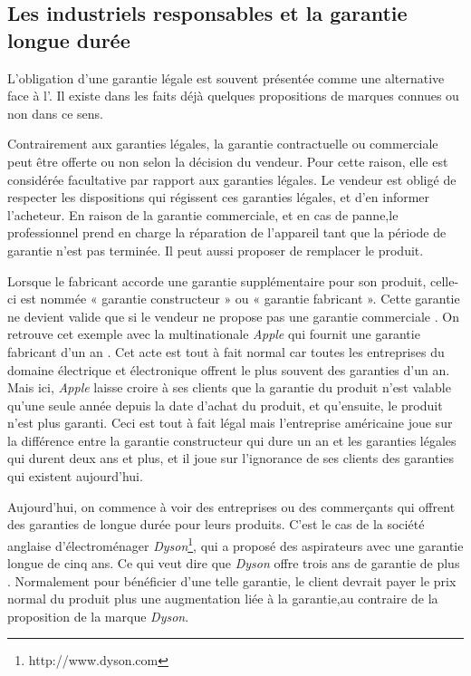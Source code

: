 \subsection{Les industriels responsables et la garantie longue durée}


L'obligation d'une garantie légale est souvent présentée comme une alternative face à l'\op. Il existe dans les faits déjà quelques propositions de marques connues ou non dans ce sens.

\bigbreak
Contrairement aux garanties légales, la garantie contractuelle ou commerciale peut être offerte ou non selon la décision du vendeur. Pour cette raison, elle est considérée facultative par rapport aux garanties légales. Le vendeur est obligé de respecter les dispositions qui régissent ces garanties légales, et d'en informer l'acheteur. 
En raison de la garantie commerciale, et en cas de panne,le professionnel prend en charge la réparation de l'appareil tant que la période de garantie n'est pas terminée. Il peut aussi proposer de remplacer le produit.

\bigbreak
Lorsque le fabricant accorde une garantie supplémentaire pour son produit, celle-ci est nommée « garantie constructeur » ou « garantie fabricant ». Cette garantie ne devient valide que si le vendeur ne propose pas une garantie commerciale \cite{loigarantie}.
On retrouve cet exemple avec la multinationale \textit{Apple} qui fournit une garantie fabricant d'un an \cite{apple}. Cet acte est tout à fait normal car toutes les entreprises du domaine électrique et électronique offrent le plus souvent des garanties d'un an. Mais ici, \textit{Apple} laisse croire à ses clients que la garantie du produit n'est valable qu'une seule année depuis la date d'achat du produit, et qu'ensuite, le produit n'est plus garanti. Ceci est tout à fait légal mais l'entreprise américaine joue sur la différence entre la garantie constructeur qui dure un an et les garanties légales qui durent deux ans et plus, et il joue sur l'ignorance de ses clients des garanties qui existent aujourd'hui.

\bigbreak
Aujourd'hui, on commence à voir des entreprises ou des commerçants qui offrent des garanties de longue durée pour leurs produits. C'est le cas de la société anglaise d'électroménager \textit{Dyson}\footnote{http://www.dyson.com}, qui a proposé des aspirateurs avec une garantie longue de cinq ans. Ce qui veut dire que \textit{Dyson} offre trois ans de garantie de plus \cite{dyson}. Normalement pour bénéficier d'une telle garantie, le client devrait payer le prix normal du produit plus une augmentation liée à la garantie,au contraire de la proposition de la marque \textit{Dyson}.

